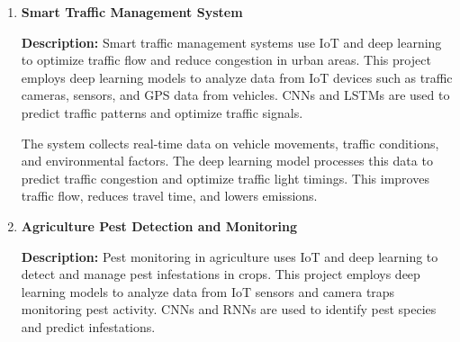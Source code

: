 \documentclass{article}
\begin{document}
\begin{enumerate}[label=\textbf{\arabic*.}, leftmargin=*]
%
%
%
%

\vspace{24pt} %
\item \textbf{Smart Traffic Management System}

\textbf{Description:}
Smart traffic management systems use IoT and deep learning to optimize traffic flow and reduce congestion in urban areas. This project employs deep learning models to analyze data from IoT devices such as traffic cameras, sensors, and GPS data from vehicles. CNNs and LSTMs are used to predict traffic patterns and optimize traffic signals.

The system collects real-time data on vehicle movements, traffic conditions, and environmental factors. The deep learning model processes this data to predict traffic congestion and optimize traffic light timings. This improves traffic flow, reduces travel time, and lowers emissions.


\vspace{24pt} %
\item \textbf{Agriculture Pest Detection and Monitoring}

\textbf{Description:}
Pest monitoring in agriculture uses IoT and deep learning to detect and manage pest infestations in crops. This project employs deep learning models to analyze data from IoT sensors and camera traps monitoring pest activity. CNNs and RNNs are used to identify pest species and predict infestations.


\end{enumerate}
\end{document}
